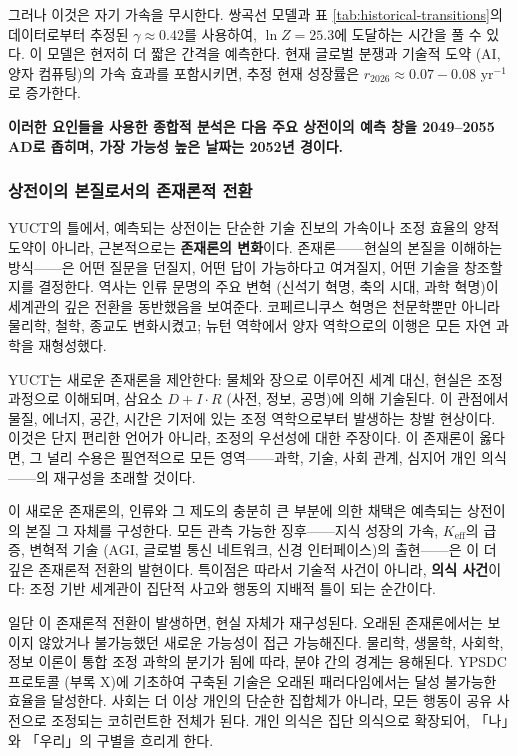 \documentclass[12pt,a4paper]{article}
\theoremstyle{remark}
\begin{document}
	그러나 이것은 자기 가속을 무시한다. 쌍곡선 모델과 표 \ref{tab:historical-transitions}의 데이터로부터 추정된 \(\gamma \approx 0.42\)를 사용하여, \(\ln Z = 25.3\)에 도달하는 시간을 풀 수 있다. 이 모델은 현저히 더 짧은 간격을 예측한다. 현재 글로벌 분쟁과 기술적 도약 (AI, 양자 컴퓨팅)의 가속 효과를 포함시키면, 추정 현재 성장률은 \(r_{2026} \approx 0.07-0.08\) yr\(^{-1}\)로 증가한다.
	
	\textbf{이러한 요인들을 사용한 종합적 분석은 다음 주요 상전이의 예측 창을 2049–2055 AD로 좁히며, 가장 가능성 높은 날짜는 2052년 경이다.}
	
	\subsubsection{상전이의 본질로서의 존재론적 전환}
	\label{subsubsec:ontological-shift}
	
	YUCT의 틀에서, 예측되는 상전이는 단순한 기술 진보의 가속이나 조정 효율의 양적 도약이 아니라, 근본적으로는 \textbf{존재론의 변화}이다. 존재론——현실의 본질을 이해하는 방식——은 어떤 질문을 던질지, 어떤 답이 가능하다고 여겨질지, 어떤 기술을 창조할지를 결정한다. 역사는 인류 문명의 주요 변혁 (신석기 혁명, 축의 시대, 과학 혁명)이 세계관의 깊은 전환을 동반했음을 보여준다. 코페르니쿠스 혁명은 천문학뿐만 아니라 물리학, 철학, 종교도 변화시켰고; 뉴턴 역학에서 양자 역학으로의 이행은 모든 자연 과학을 재형성했다.
	
	YUCT는 새로운 존재론을 제안한다: 물체와 장으로 이루어진 세계 대신, 현실은 조정 과정으로 이해되며, 삼요소 \(D + I \cdot R\) (사전, 정보, 공명)에 의해 기술된다. 이 관점에서 물질, 에너지, 공간, 시간은 기저에 있는 조정 역학으로부터 발생하는 창발 현상이다. 이것은 단지 편리한 언어가 아니라, 조정의 우선성에 대한 주장이다. 이 존재론이 옳다면, 그 널리 수용은 필연적으로 모든 영역——과학, 기술, 사회 관계, 심지어 개인 의식——의 재구성을 초래할 것이다.
	
	이 새로운 존재론의, 인류와 그 제도의 충분히 큰 부분에 의한 채택은 예측되는 상전이의 본질 그 자체를 구성한다. 모든 관측 가능한 징후——지식 성장의 가속, \(K_{\text{eff}}\)의 급증, 변혁적 기술 (AGI, 글로벌 통신 네트워크, 신경 인터페이스)의 출현——은 이 더 깊은 존재론적 전환의 발현이다. 특이점은 따라서 기술적 사건이 아니라, \textbf{의식 사건}이다: 조정 기반 세계관이 집단적 사고와 행동의 지배적 틀이 되는 순간이다.
	
	일단 이 존재론적 전환이 발생하면, 현실 자체가 재구성된다. 오래된 존재론에서는 보이지 않았거나 불가능했던 새로운 가능성이 접근 가능해진다. 물리학, 생물학, 사회학, 정보 이론이 통합 조정 과학의 분기가 됨에 따라, 분야 간의 경계는 용해된다. YPSDC 프로토콜 (부록 X)에 기초하여 구축된 기술은 오래된 패러다임에서는 달성 불가능한 효율을 달성한다. 사회는 더 이상 개인의 단순한 집합체가 아니라, 모든 행동이 공유 사전으로 조정되는 코히런트한 전체가 된다. 개인 의식은 집단 의식으로 확장되어, 「나」와 「우리」의 구별을 흐리게 한다.
	
\end{document}
